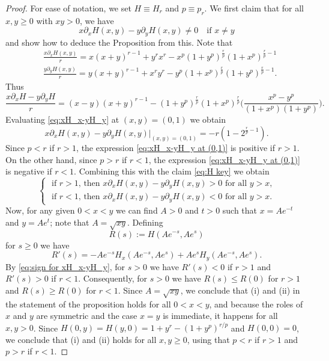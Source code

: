 \documentclass[reqno, 10pt]{amsart}
\theoremstyle{plain}
\numberwithin{equation}{section}
\theoremstyle{definition}
\newtheorem*{induction hypothesis}{Induction hypothesis}
\theoremstyle{remark}
\begin{document}
\begin{proof}
For ease of notation, we set $H \equiv H_r$ and $p \equiv p_r$. We first claim that for all $x,y \geq 0$ with $x y >0$, we have
\begin{equation}\label{eq:H key}
    x \partial_x H(x,y) - y \partial_y H(x,y) \neq 0 \quad \text{if $x \neq y$}
\end{equation}
and show how to deduce the Proposition from this. Note that
\begin{align*}
&\frac{x\partial_x H(x,y)}{r} =  x(x+y)^{r-1}+y^rx^r - x^p(1+y^p)^\frac{r}{p}(1+x^p)^{\frac{r}{p}-1}\\
&\frac{y\partial_y H(x,y)}{r} = y(x+y)^{r-1} + x^ry^r - y^p(1+x^p)^\frac{r}{p}(1+y^p)^{\frac{r}{p}-1}.
\end{align*}
Thus 
\begin{equation}\label{eq:xH_x-yH_y}
    \frac{x \partial_x H - y\partial_y H}{r}=(x-y)(x+y)^{r-1} - (1+y^p)^{\frac{r}{p}}(1+x^p)^\frac{r}{p} \Big( \frac{x^p - y^p}{(1+x^p)(1+y^p)}\Big).
\end{equation}
Evaluating \eqref{eq:xH_x-yH_y} at $(x,y)=(0,1)$ we obtain
\begin{equation}\label{eq:xH_x-yH_y at (0,1)}
    x \partial_x H(x,y) - y\partial_yH(x,y)|_{(x,y)=(0,1)}=-r(1-2^{\frac{r}{p}-1}).
\end{equation}
Since $p < r$ if $r>1$, the expression \eqref{eq:xH_x-yH_y at (0,1)} is positive if $r>1$. On the other hand, since $p>r$ if $r < 1$, the expression \eqref{eq:xH_x-yH_y at (0,1)} is negative if $r <1$. Combining this with the claim \eqref{eq:H key} we obtain
\begin{equation}\label{eq:sign for xH_x-yH_y}
    \begin{cases}
        \text{ if $r > 1$, then $x\partial_x H(x,y)-y \partial_y H(x,y)>0$ for all $y>x$,} \\
        \text{ if $r < 1$, then $x \partial_x H(x,y)-y\partial_y H(x,y)<0$ for all $y>x$.}
    \end{cases}
\end{equation}
Now, for any given $0 <x < y $ we can find $A>0$ and $t>0$ such that $x=Ae^{-t}$ and $y=Ae^t$; note that $A=\sqrt{xy}$. Defining
\begin{equation*}
    R(s):=H(A e^{-s}, A e^s)
\end{equation*}
for $s  \geq 0$ we have
\begin{equation*}
    R'(s)=-Ae^{-s} H_x(A e^{-s},Ae^s) + Ae^s H_y (Ae^{-s}, Ae^s).
\end{equation*}
By \eqref{eq:sign for xH_x-yH_y}, for $s>0$ we have $R'(s) < 0$ if $r >1$ and $R'(s)>0$ if $r <1$. Consequently, for $s>0$ we have $R(s) \leq R(0)$ for $r > 1$ and $R(s) \geq R(0)$ for $r<1$. Since $A=\sqrt{xy}$, we conclude that (i) and (ii) in the statement of the proposition holds for all $0 < x < y $, and because the roles of $x$ and $y$ are symmetric and the case $x=y$ is immediate, it happens for all $x,y>0$. Since $H(0,y)=H(y,0)=1+y^r - (1+y^p)^{r/p}$ and $H(0,0)=0$, we conclude that (i) and (ii) holds for all $x,y \geq 0$, using that $p < r$ if $r >1$ and $p>r$ if $r <1$.








\end{proof}
\end{document}
